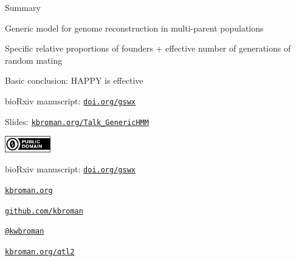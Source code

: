 \documentclass[aspectratio=169,12pt,t]{beamer}
\begin{document}
\begin{frame}[c]{Summary}

  \bbi

\item Generic model for genome reconstruction in multi-parent
  populations

\item Specific relative proportions of founders + effective number of
  generations of random mating

\item Basic conclusion: {\hilit HAPPY is effective}

\item bioRxiv manuscript:
  \href{https://doi.org/gswx}{\tt \lolit doi.org/gswx}


  \ei


\end{frame}



\begin{frame}[c]{}

\Large

Slides: \href{https://kbroman.org/Talk_GenericHMM}{\tt kbroman.org/Talk\_GenericHMM}

\vspace*{-7mm}
\hfill
\href{https://creativecommons.org/publicdomain/zero/1.0/}{\includegraphics[height=7mm]{Figs/cc-zero.png}}

\vspace{3mm}

bioRxiv manuscript:
\href{https://doi.org/gswx}{\tt \lolit doi.org/gswx}

\vspace{4mm}

\href{https://kbroman.org}{\tt \lolit kbroman.org}

\vspace{4mm}

\href{https://github.com/kbroman}{\tt \lolit github.com/kbroman}

\vspace{4mm}

\href{https://twitter.com/kwbroman}{\tt \lolit @kwbroman}

\vspace{4mm}

\href{https://kbroman.org/qtl2}{\tt \lolit kbroman.org/qtl2}





\end{frame}
\end{document}
